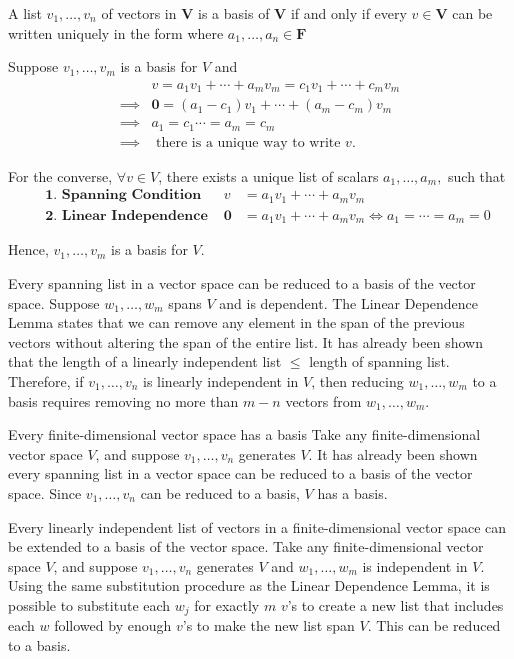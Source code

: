 \documentclass[11pt]{article} %
\newcommand\F[1]{\mathbf{F^{#1}}}
\newcommand\V{\mathbf{V}}
\newcommand\lc[3]{#1_1 #2_1 + \cdots + #1_{#3} #2_{#3}}
\newcommand\ls[2]{#1_1, \ldots, #1_{#2}}
\newcommand\0{\mathbf{0}}
\begin{document}
{A list $\ls{v}{n}$ of vectors in $\V$ is a basis of $\V$ if and only if every $v \in \V$ can be written uniquely in the form
\mathdiv{v = \lc{a}{v}{n}}
where $\ls{a}{n} \in \F{}$
}
{
Suppose $\ls{v}{m}$ is a basis for $V$ and
\begin{align*}
&v = \lc avm = \lc cvm\\
\implies& \0 = (a_1 - c_1) v_1 + \cdots + (a_m - c_m) v_m \\
\implies& a_1 = c_1 \cdots = a_m = c_m \\
\implies& \text{ there is a unique way to write } v.
\end{align*}

For the converse, $\forall v \in V$, there exists a unique list of scalars $\ls am,$ such that
\begin{align*}
&\textbf{ 1. Spanning Condition } &v &= \lc avm \\
&\textbf{ 2. Linear Independence } &\0 &= \lc avm  \iff a_1 = \cdots = a_m = 0
\end{align*}

Hence, $\ls{v}{m}$ is a basis for $V$.
}
{Every spanning list in a vector space can be reduced to a basis of the vector space.}
{
Suppose $\ls{w}{m}$ spans $V$ and is dependent. The Linear Dependence Lemma states that we can remove any element in the span of the previous vectors without altering the span of the entire list. It has already been shown that the length of a linearly independent list $\le$ length of spanning list. Therefore, if $\ls{v}{n}$ is linearly independent in $V$, then reducing $\ls{w}{m}$ to a basis requires removing no more than $m-n$ vectors from $\ls{w}{m}$.
}

{Every finite-dimensional vector space has a basis}
{
Take any finite-dimensional vector space $V$, and suppose $\ls{v}{n}$ generates $V$. It has already been shown every spanning list in a vector space can be reduced to a basis of the vector space. Since $\ls{v}{n}$ can be reduced to a basis, $V$ has a basis. 
}

{Every linearly independent list of vectors in a finite-dimensional vector space can be extended to a basis of the vector space.}
{
Take any finite-dimensional vector space $V$, and suppose $\ls vn$ generates $V$ and $\ls{w}{m}$ is independent in $V$. Using the same substitution procedure as the Linear Dependence Lemma, it is possible to substitute each $w_j$ for exactly $m$ $v$'s to create a new list that includes each $w$ followed by enough $v$'s to make the new list span $V$. This can be reduced to a basis.
}
\end{document}
